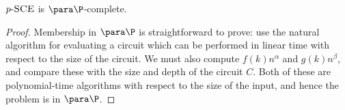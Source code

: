 \documentclass{article}
\newcommand{\dash}{\textnormal{-}}
\newcommand{\pSCE}{p \dash \textsc{SCE}}
\begin{document}
\begin{theorem}\label{thm:psce}
  $\pSCE$ is $\para \P$-complete.
\end{theorem}
\begin{proof}
  Membership in $\para \P$ is straightforward to prove: use the natural algorithm for evaluating a circuit which can be performed in linear time with respect to the size of the circuit.
  We must also compute $f(k) n^\alpha$ and $g(k) n^\beta$, and compare these with the size and depth of the circuit $C$.
  Both of these are polynomial-time algorithms with respect to the size of the input, and hence the problem is in $\para \P$.




\end{proof}
\end{document}
